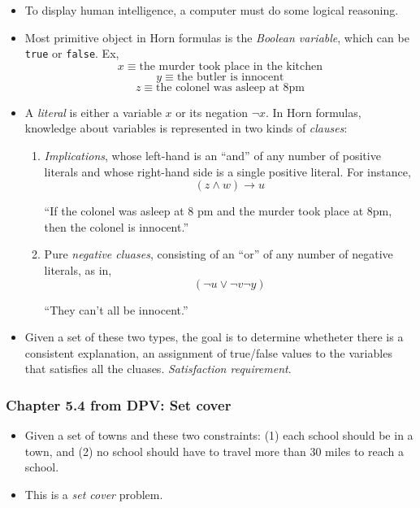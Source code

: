 \documentclass[a4paper,11pt]{article}
\begin{document}
\begin{itemize}
\item
  To display human intelligence, a computer must do some logical
  reasoning.
\item
  Most primitive object in Horn formulas is the \emph{Boolean variable},
  which can be \texttt{true} or \texttt{false}. Ex,
  \[x \equiv \text{the murder took place in the kitchen}\]
  \[y \equiv \text{the butler is innocent}\]
  \[z \equiv \text{the colonel was asleep at 8pm}\]
\item
  A \emph{literal} is either a variable $x$ or its negation $\lnot x$.
  In Horn formulas, knowledge about variables is represented in two
  kinds of \emph{clauses}:

  \begin{enumerate}
  \def\labelenumi{\arabic{enumi}.}
  \item
    \emph{Implications}, whose left-hand is an ``and'' of any number of
    positive literals and whose right-hand side is a single positive
    literal. For instance, \[(z \land w) \to u\]

    ``If the colonel was asleep at 8 pm and the murder took place at
    8pm, then the colonel is innocent.''
  \item
    Pure \emph{negative cluases}, consisting of an ``or'' of any number
    of negative literals, as in, \[(\lnot u \lor \lnot v \lnot y)\]

    ``They can't all be innocent.''
  \end{enumerate}
\item
  Given a set of these two types, the goal is to determine whetheter
  there is a consistent explanation, an assignment of true/false values
  to the variables that satisfies all the cluases. \emph{Satisfaction
  requirement}.
\end{itemize}

\subsubsection{Chapter 5.4 from DPV: Set
cover}\label{chapter-5.4-from-dpv-set-cover}

\begin{itemize}
\itemsep1pt\parskip0pt
\item
  Given a set of towns and these two constraints: (1) each school should
  be in a town, and (2) no school should have to travel more than 30
  miles to reach a school.
\item
  This is a \emph{set cover} problem.
\end{itemize}
\end{document}
